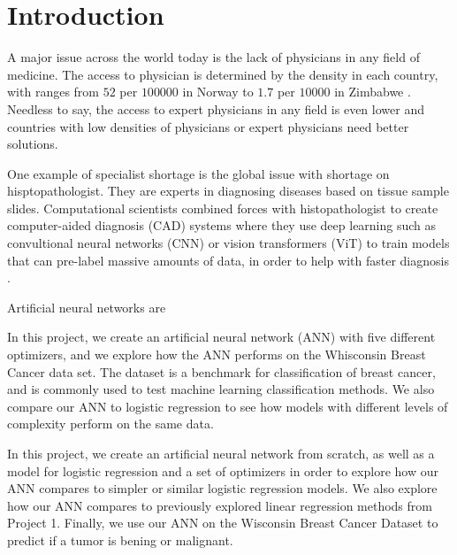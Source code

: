 \section{Introduction}\label{sec:introduction}

A major issue across the world today is the lack of physicians in any field of medicine. The access to physician is determined by the 
density in each country, with ranges from $52$ per $10 0000$ in Norway to $1.7$ per $10 000$ in Zimbabwe \cite{who_physicians}. Needless to say, 
the access to expert physicians in any field is even lower and countries with low densities of physicians or expert physicians need better
solutions. 

One example of specialist shortage is the global issue with shortage on hisptopathologist. They are experts in diagnosing 
diseases based on tissue sample slides. Computational scientists combined forces with histopathologist to create computer-aided 
diagnosis (CAD) systems where they use deep learning such as convultional neural networks (CNN) or vision transformers (ViT)
to train models that can pre-label massive amounts of data, in order to help with faster diagnosis \cite{histopath_AI}.

Artificial neural networks are 

In this project, we create an artificial neural network (ANN) with five different optimizers, and we explore how the ANN performs on the 
Whisconsin Breast Cancer data set. The dataset is a benchmark for classification of breast cancer, and is commonly used to test machine learning 
classification methods. We also compare our ANN to logistic regression to see how models with different levels of complexity perform on the same data. 

In this project, we create an artificial neural network from scratch, as well as a model for logistic regression and a set of optimizers 
in order to explore how our ANN compares to simpler or similar logistic regression models. We also explore how our ANN compares to previously 
explored linear regression methods from Project 1. Finally, we use our ANN on the Wisconsin Breast Cancer Dataset to predict if a
tumor is bening or malignant. 




